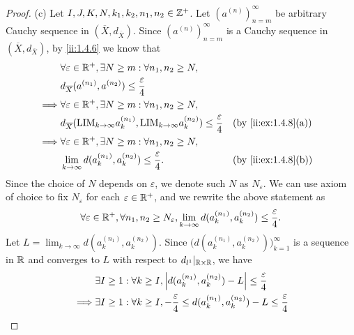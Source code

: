 \begin{proof}{(c)}
  Let \(I, J, K, N, k_1, k_2, n_1, n_2 \in \mathbb{Z}^+\).
  Let \((a^{(n)})_{n = m}^\infty\) be arbitrary Cauchy sequence in \((\overline{X}, d_{\overline{X}})\).
  Since \((a^{(n)})_{n = m}^\infty\) is a Cauchy sequence in \((\overline{X}, d_{\overline{X}})\), by \cref{ii:1.4.6} we know that
  \begin{align*}
             & \forall \varepsilon \in \R^+, \exists N \geq m : \forall n_1, n_2 \geq N,                                                                        \\
             & d_{\overline{X}}(a^{(n_1)}, a^{(n_2)}) \leq \dfrac{\varepsilon}{4}                                                                               \\
    \implies & \forall \varepsilon \in \R^+, \exists N \geq m : \forall n_1, n_2 \geq N,                                                                        \\
             & d_{\overline{X}}(\text{LIM}_{k \to \infty} a_k^{(n_1)}, \text{LIM}_{k \to \infty} a_k^{(n_2)}) \leq \dfrac{\varepsilon}{4} &  & \by{ii:ex:1.4.8}[a] \\
    \implies & \forall \varepsilon \in \R^+, \exists N \geq m : \forall n_1, n_2 \geq N,                                                                        \\
             & \lim_{k \to \infty} d(a_k^{(n_1)}, a_k^{(n_2)}) \leq \dfrac{\varepsilon}{4}.                                               &  & \by{ii:ex:1.4.8}[b]
  \end{align*}
  Since the choice of \(N\) depends on \(\varepsilon\), we denote such \(N\) as \(N_\varepsilon\).
  We can use axiom of choice to fix \(N_\varepsilon\) for each \(\varepsilon \in \mathbb{R}^+\), and we rewrite the above statement as
  \[
    \forall \varepsilon \in \mathbb{R}^+, \forall n_1, n_2 \geq N_\varepsilon, \lim_{k \to \infty} d(a_k^{(n_1)}, a_k^{(n_2)}) \leq \dfrac{\varepsilon}{4}.
  \]
  Let \(L = \lim_{k \to \infty} d(a_k^{(n_1)}, a_k^{(n_2)})\).
  Since \(\Big(d(a_k^{(n_1)}, a_k^{(n_2)})\Big)_{k = 1}^\infty\) is a sequence in \(\mathbb{R}\) and converges to \(L\) with respect to \(d_{l^1}|_{\mathbb{R} \times \mathbb{R}}\), we have
  \begin{align*}
             & \exists I \geq 1 : \forall k \geq I, \abs{d(a_k^{(n_1)}, a_k^{(n_2)}) - L} \leq \dfrac{\varepsilon}{4}                                                                                              \\
    \implies & \exists I \geq 1 : \forall k \geq I, -\dfrac{\varepsilon}{4} \leq d(a_k^{(n_1)}, a_k^{(n_2)}) - L \leq \dfrac{\varepsilon}{4}                                                                       \\

\end{align*}
\end{proof}
